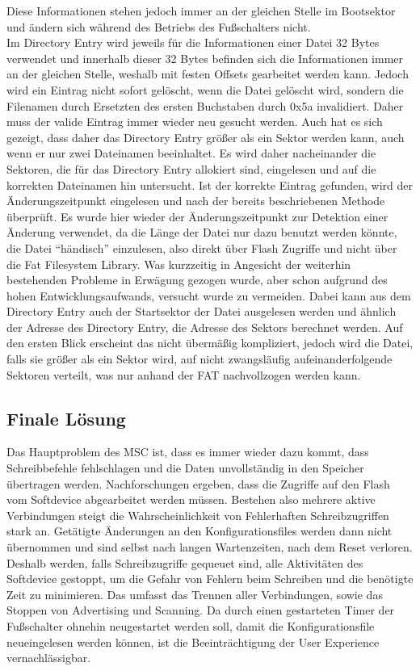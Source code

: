 Diese Informationen stehen jedoch immer an der gleichen Stelle im Bootsektor und ändern sich während des Betriebs des Fußschalters nicht. \\
Im Directory Entry wird jeweils für die Informationen einer Datei 32 Bytes verwendet und innerhalb dieser 32 Bytes befinden sich die Informationen immer an der gleichen Stelle, weshalb mit festen Offsets gearbeitet werden kann. Jedoch wird ein Eintrag nicht sofort gelöscht, wenn die Datei gelöscht wird, sondern die Filenamen durch Ersetzten des ersten Buchstaben durch 0x5a invalidiert. Daher muss der valide Eintrag immer wieder neu gesucht werden. Auch hat es sich gezeigt, dass daher das Directory Entry größer als ein Sektor werden kann, auch wenn er nur zwei Dateinamen beeinhaltet. Es wird daher nacheinander die Sektoren, die für das Directory Entry allokiert sind, eingelesen und auf die korrekten Dateinamen hin untersucht. Ist der korrekte Eintrag gefunden, wird der Änderungszeitpunkt eingelesen und nach der bereits beschriebenen Methode überprüft. Es wurde hier wieder der Änderungszeitpunkt zur Detektion einer Änderung verwendet, da die Länge der Datei nur dazu benutzt werden könnte, die Datei ``händisch'' einzulesen, also direkt über Flash Zugriffe und nicht über die Fat Filesystem Library. Was kurzzeitig in Angesicht der weiterhin bestehenden Probleme in Erwägung gezogen wurde, aber schon aufgrund des hohen Entwicklungsaufwands, versucht wurde zu vermeiden. Dabei kann aus dem Directory Entry auch der Startsektor der Datei ausgelesen werden und ähnlich der Adresse des Directory Entry, die Adresse des Sektors berechnet werden. Auf den ersten Blick erscheint das nicht übermäßig kompliziert, jedoch wird die Datei, falls sie größer als ein Sektor wird, auf nicht zwangsläufig aufeinanderfolgende Sektoren verteilt, was nur anhand der FAT nachvollzogen werden kann.

\subsection{Finale Lösung}
Das Hauptproblem des MSC ist, dass es immer wieder dazu kommt, dass Schreibbefehle fehlschlagen und die Daten unvollständig in den Speicher übertragen werden. Nachforschungen ergeben, dass die Zugriffe auf den Flash vom Softdevice abgearbeitet werden müssen. Bestehen also mehrere aktive Verbindungen steigt die Wahrscheinlichkeit von Fehlerhaften Schreibzugriffen stark an. Getätigte Änderungen an den Konfigurationsfiles werden dann nicht übernommen und sind selbst nach langen Wartenzeiten, nach dem Reset verloren. Deshalb werden, falls Schreibzugriffe gequeuet sind, alle Aktivitäten des Softdevice gestoppt, um die Gefahr von Fehlern beim Schreiben und die benötigte Zeit zu minimieren. Das umfasst das Trennen aller Verbindungen, sowie das Stoppen von Advertising und Scanning. Da durch einen gestarteten Timer der Fußschalter ohnehin neugestartet werden soll, damit die Konfigurationsfile neueingelesen werden können, ist die Beeinträchtigung der User Experience vernachlässigbar. 
